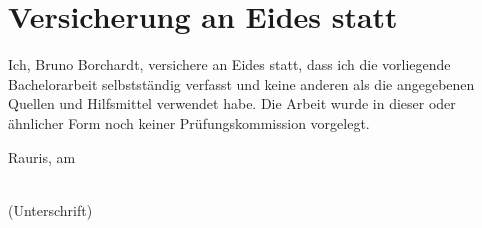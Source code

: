 


\chapter*{Versicherung an Eides statt}
Ich, Bruno Borchardt, versichere an Eides statt, dass ich die vorliegende Bachelorarbeit selbstständig verfasst und keine anderen als die angegebenen Quellen und Hilfsmittel verwendet habe. Die Arbeit wurde in dieser oder ähnlicher Form noch keiner Prüfungskommission vorgelegt.

\vspace*{5cm}

\noindent
\begin{minipage}[h]{0.4\linewidth}
Rauris, am\dotfill\\
\vspace*{2.5mm}
\end{minipage}
\hspace*{0.1\linewidth}
\begin{minipage}[h]{0.5\linewidth}
  \begin{center}
    \dotfill\\
    (Unterschrift)
  \end{center}
\end{minipage}
